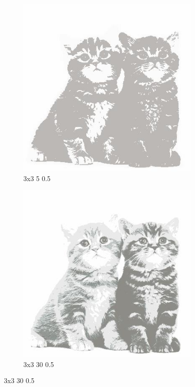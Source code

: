 \documentclass[12pt,a4paper]{article}
\begin{document}
\begin{figure}[H]
\begin{subfigure}{0.25\textwidth}
  \includegraphics[width=\linewidth]{images/big/3-3-5-05}
  \caption{3x3 5 0.5}
  \label{fig:2}
\end{subfigure}\hfil %
\begin{subfigure}{0.25\textwidth}
  \includegraphics[width=\linewidth]{images/big/3-3-30-05}
  \caption{3x3 30 0.5}
  \label{fig:3}
\end{subfigure}


\end{figure}
\end{document}
